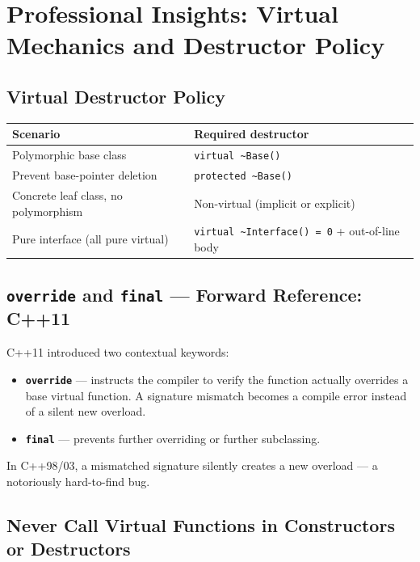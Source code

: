 \section{Professional Insights: Virtual Mechanics and Destructor Policy}
\label{sec:pro-insights-ch6}

\subsection{Virtual Destructor Policy}

\begin{center}
\begin{tabular}{|l|l|}
\hline
\textbf{Scenario} & \textbf{Required destructor} \\
\hline
Polymorphic base class                & \texttt{virtual \~{}Base()} \\
Prevent base-pointer deletion         & \texttt{protected \~{}Base()} \\
Concrete leaf class, no polymorphism  & Non-virtual (implicit or explicit) \\
Pure interface (all pure virtual)     & \texttt{virtual \~{}Interface() = 0} + out-of-line body \\
\hline
\end{tabular}
\end{center}

\subsection{\texttt{override} and \texttt{final} --- Forward Reference: C++11}

C++11 introduced two contextual keywords:

\begin{itemize}
    \item \textbf{\texttt{override}} --- instructs the compiler to verify the function actually overrides a base virtual function. A signature mismatch becomes a compile error instead of a silent new overload.
    \item \textbf{\texttt{final}} --- prevents further overriding or further subclassing.
\end{itemize}

In C++98/03, a mismatched signature silently creates a new overload --- a notoriously hard-to-find bug.

\subsection{Never Call Virtual Functions in Constructors or Destructors}

